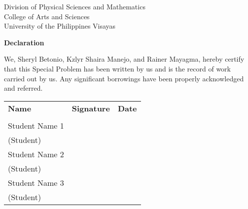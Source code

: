 \begin{center}
	Division of Physical Sciences and Mathematics\\
	College of Arts and Sciences\\
	University of the Philippines Visayas 
	
		\textbf{Declaration}
		\end{center}

We,  Sheryl Betonio, Kzlyr Shaira Manejo, and Rainer Mayagma, hereby certify that this Special Problem has been written by us  and is the record of work carried out by us. Any significant borrowings have been properly acknowledged and referred.

	\begin{tabular}{lll}
	\bfseries Name  & \bfseries Signature & \bfseries Date\\ \\
	Student Name 1 &\signaturerule  & \signaturerule\\ 
	\multicolumn{1}{l}{(Student)} \\ 
	Student Name 2 &\signaturerule  & \signaturerule\\ 
	\multicolumn{1}{l}{(Student)} \\
	Student Name 3 &\signaturerule  & \signaturerule\\ 
\multicolumn{1}{l}{(Student)} \\

\end{tabular}



